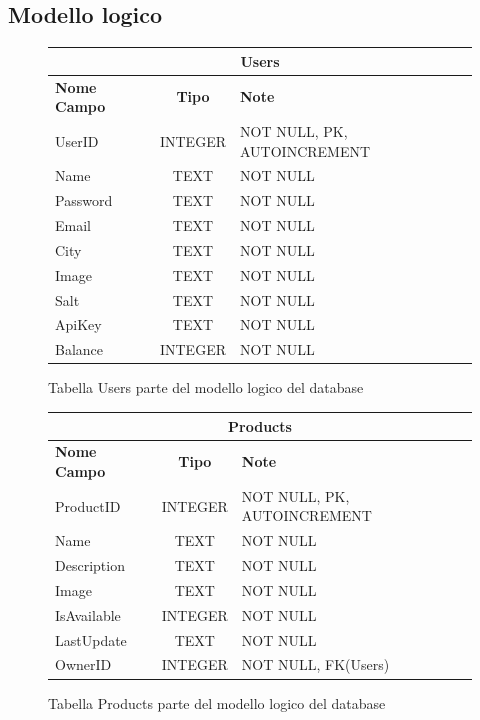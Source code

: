 \subsection{Modello logico}
\begin{figure}[ht]
    \centering\begin{tabular}{ |l|c|l| } 
    \hline
    \multicolumn{3}{|c|}{\large\textbf{Users}} \\
    \hline
    \textbf{Nome Campo} & \textbf{Tipo} & \textbf{Note} \\
    \hline
    UserID & INTEGER & NOT NULL, PK, AUTOINCREMENT \\
    Name & TEXT & NOT NULL \\
    Password & TEXT & NOT NULL \\
    Email & TEXT & NOT NULL \\
    City & TEXT & NOT NULL \\
    Image & TEXT & NOT NULL \\
    Salt & TEXT & NOT NULL \\
    ApiKey & TEXT & NOT NULL \\
    Balance & INTEGER & NOT NULL \\
    \hline
    \end{tabular}
    \caption{Tabella Users parte del modello logico del database}
\end{figure}
\begin{figure}[ht]
    \centering\begin{tabular}{ |l|c|l| } 
    \hline
    \multicolumn{3}{|c|}{\large\textbf{Products}} \\
    \hline
    \textbf{Nome Campo} & \textbf{Tipo} & \textbf{Note} \\
    \hline
    ProductID & INTEGER & NOT NULL, PK, AUTOINCREMENT \\
    Name & TEXT & NOT NULL \\
    Description & TEXT & NOT NULL \\
    Image & TEXT & NOT NULL \\
    IsAvailable & INTEGER & NOT NULL \\
    LastUpdate & TEXT & NOT NULL \\
    OwnerID & INTEGER & NOT NULL, FK(Users) \\
    \hline
    \end{tabular}
    \caption{Tabella Products parte del modello logico del database}
\end{figure}
